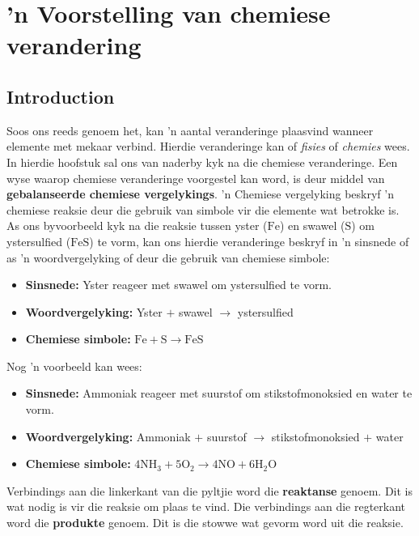  \chapter{ 'n Voorstelling van chemiese verandering}
    \setcounter{figure}{1}
    \setcounter{subfigure}{1}
    \label{337cc49099d6e82169c54b5d0fc3878f}
         \section{Introduction}
    \nopagebreak

Soos ons reeds genoem het, kan 'n aantal veranderinge plaasvind wanneer elemente met mekaar verbind. Hierdie veranderinge kan of \textsl{fisies} of \textsl{chemies} wees. In hierdie hoofstuk sal ons van naderby kyk na die chemiese veranderinge. Een wyse waarop chemiese veranderinge voorgestel kan word, is deur middel van \textbf{gebalanseerde chemiese vergelykings}. 'n Chemiese vergelyking beskryf 'n chemiese reaksie deur die gebruik van simbole vir die elemente wat betrokke is. As ons byvoorbeeld kyk na die reaksie tussen yster ($\text{Fe}$) en swawel ($\text{S}$) om ystersulfied ($\text{FeS}$) te vorm, kan ons hierdie veranderinge beskryf in 'n sinsnede of as 'n woordvergelyking of deur die gebruik van chemiese simbole:
\begin{itemize}[noitemsep]
\item \textbf{Sinsnede:} Yster reageer met swawel om ystersulfied te vorm.
\item \textbf{Woordvergelyking:} Yster $+$ swawel $\to$ ystersulfied 
\item \textbf{Chemiese simbole:} $\text{Fe} + \text{S} \to \text{FeS}$
\end{itemize}
Nog 'n voorbeeld kan wees:
\begin{itemize}[noitemsep]
\item \textbf{Sinsnede:} Ammoniak reageer met suurstof om stikstofmonoksied en water te vorm.
\item \textbf{Woordvergelyking:} Ammoniak $+$ suurstof $\to$ stikstofmonoksied $+$ water
\item \textbf{Chemiese simbole:} $4{\text{NH}}_{3} + 5{\text{O}}_{2} \to 4\text{NO} + 6{\text{H}}_{2}\text{O}$
\end{itemize} 
Verbindings aan die linkerkant van die pyltjie word die \textbf{reaktanse} genoem. Dit is wat nodig is vir die
reaksie om plaas te vind. Die verbindings aan die regterkant word die \textbf{produkte} genoem. Dit is die stowwe wat gevorm word uit die reaksie.\par 

